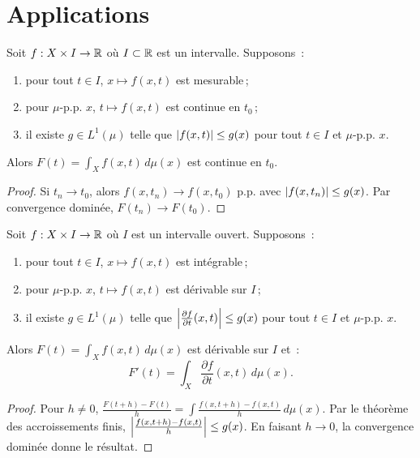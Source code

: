 \section{Applications}

\begin{corollaire}
\label{cor:continuite_integrale}
Soit $f : X \times I \to \mathbb{R}$ o\`u $I \subset \mathbb{R}$ est un intervalle. Supposons~:
\begin{enumerate}
    \item pour tout $t \in I$, $x \mapsto f(x, t)$ est mesurable\,;
    \item pour $\mu$-p.p. $x$, $t \mapsto f(x, t)$ est continue en $t_0$\,;
    \item il existe $g \in L^1(\mu)$ telle que $\left| f(x, t) \right| \leq g(x)$ pour
    tout $t \in I$ et $\mu$-p.p. $x$.
\end{enumerate}
Alors $F(t) = \int_X f(x, t)\, d\mu(x)$ est continue en $t_0$.
\end{corollaire}

\begin{proof}
Si $t_n \to t_0$, alors $f(x, t_n) \to f(x, t_0)$ p.p. avec $\left| f(x, t_n) \right|
\leq g(x)$. Par convergence domin\'ee, $F(t_n) \to F(t_0)$.
\end{proof}

\begin{corollaire}
\label{cor:derivation_integrale}
Soit $f : X \times I \to \mathbb{R}$ o\`u $I$ est un intervalle ouvert. Supposons~:
\begin{enumerate}
    \item pour tout $t \in I$, $x \mapsto f(x, t)$ est int\'egrable\,;
    \item pour $\mu$-p.p. $x$, $t \mapsto f(x, t)$ est d\'erivable sur $I$\,;
    \item il existe $g \in L^1(\mu)$ telle que
    $\left| \frac{\partial f}{\partial t}(x, t) \right| \leq g(x)$ pour tout $t \in I$
    et $\mu$-p.p. $x$.
\end{enumerate}
Alors $F(t) = \int_X f(x, t)\, d\mu(x)$ est d\'erivable sur $I$ et~:
\[
F'(t) = \int_X \frac{\partial f}{\partial t}(x, t)\, d\mu(x).
\]
\end{corollaire}

\begin{proof}
Pour $h \neq 0$, $\frac{F(t+h) - F(t)}{h} = \int \frac{f(x, t+h) - f(x, t)}{h}
\, d\mu(x)$. Par le th\'eor\`eme des accroissements finis,
$\left| \frac{f(x, t+h) - f(x, t)}{h} \right| \leq g(x)$. En faisant $h \to 0$, la
convergence domin\'ee donne le r\'esultat.
\end{proof}

